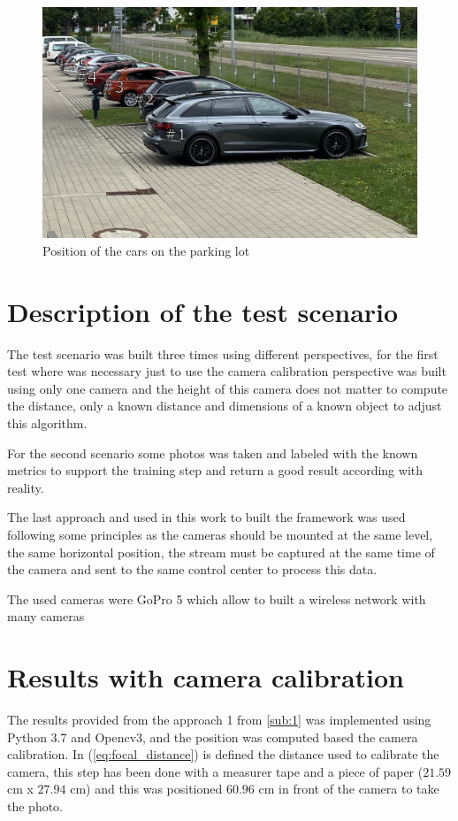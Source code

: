 \begin{figure}[H]
\centering
\includegraphics[scale=0.5]{imagens/park.JPG}
\caption{Position of the cars on the parking lot}
\label{fig:park}
\end{figure}

\section{Description of the test scenario}

The test scenario was built three times using different perspectives, for the first test where was necessary just to use the camera calibration perspective was built using only one camera and the height of this camera does not matter to compute the distance, only a known distance and dimensions of a known object to adjust this algorithm.

For the second scenario some photos was taken and labeled with the known metrics to support the training step and return a good result according with reality. 

The last approach and used in this work to built the framework was used following some principles as the cameras should be mounted at the same level, the same horizontal position,  the stream must be captured at the same time of the camera and sent to the same control center to process this data. 

The used cameras were GoPro 5 which allow to built a wireless network with many cameras 


\section{Results with camera calibration}

The results provided from the approach 1 from \ref{sub:1} was implemented using Python 3.7 and Opencv3, and the position was computed based the camera calibration. In (\ref{eq:focal_distance}) is defined the distance used to calibrate the camera, this step has been done with a measurer tape and a piece of paper ($21.59$ cm x  $27.94$ cm) and this was positioned $60.96$ cm in front of the camera to take the photo.

